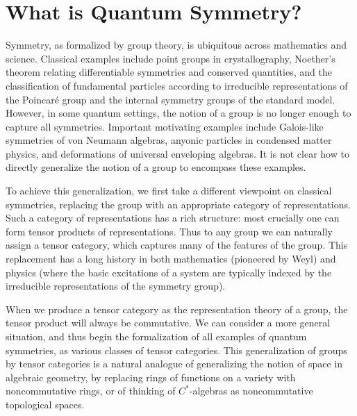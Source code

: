 \documentclass[12pt]{article}
\begin{document}
\section{What is Quantum Symmetry?}

Symmetry, as formalized by group theory, is ubiquitous across mathematics and science. Classical examples include point groups in crystallography, Noether's theorem relating differentiable symmetries and conserved quantities, and the classification of fundamental particles according to irreducible representations of the Poincar\'e group and the internal symmetry groups of the standard model. However, in some quantum settings, the notion of a group is no longer enough to capture all symmetries.  Important motivating examples include Galois-like symmetries of von Neumann algebras, anyonic particles in condensed matter physics, and deformations of universal enveloping algebras. It is not clear how to directly generalize the notion of a group to encompass these examples.

To achieve this generalization, we first take a different viewpoint on classical symmetries, replacing the group with an appropriate category of representations.  Such a category of representations has a rich structure: most crucially one can form tensor products of representations.  Thus to any group we can naturally assign a tensor category, which captures many of the features of the group. This replacement has a long history in both mathematics (pioneered by Weyl) and physics (where the basic excitations of a system are typically indexed by the irreducible representations of the symmetry group).

When we produce a tensor category as the representation theory of a group, the tensor product will always be commutative. We can consider a more general situation, and thus begin the formalization of all examples of quantum symmetries, as various classes of tensor categories.  This generalization of groups by tensor categories is a natural analogue of generalizing the notion of space in algebraic geometry, by replacing rings of functions on a variety with noncommutative rings, or of thinking of $C^*$-algebras as noncommutative topological spaces.
\end{document}
